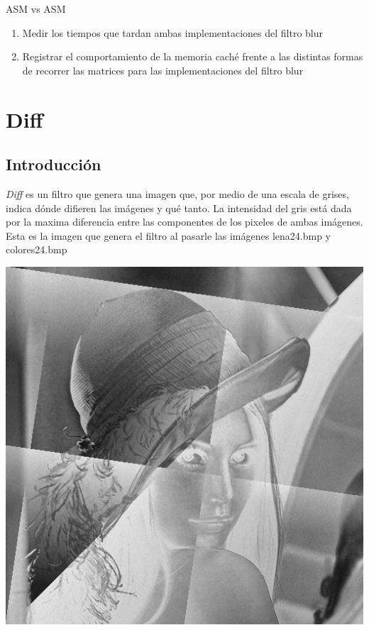 \documentclass[10pt,a4paper,spanish]{article}
\begin{document}
ASM vs ASM

\begin{enumerate}
	\item Medir los tiempos que tardan ambas implementaciones del filtro blur
	\item Registrar el comportamiento de la memoria caché frente a las distintas formas de recorrer las matrices para las implementaciones del filtro blur
\end{enumerate}

\section{Diff}

\subsection{Introducción}

\textit{Diff} es un filtro que genera una imagen que, por medio de una escala de grises, indica dónde difieren las imágenes y qué tanto.
La intensidad del gris está dada por la maxima diferencia entre las componentes de los pixeles de ambas imágenes. \\

Esta es la imagen que genera el filtro al pasarle las imágenes lena24.bmp y colores24.bmp \\

\begin{center}\includegraphics[keepaspectratio]{diff_lena24_colores24.png}\end{center}
\end{document}
